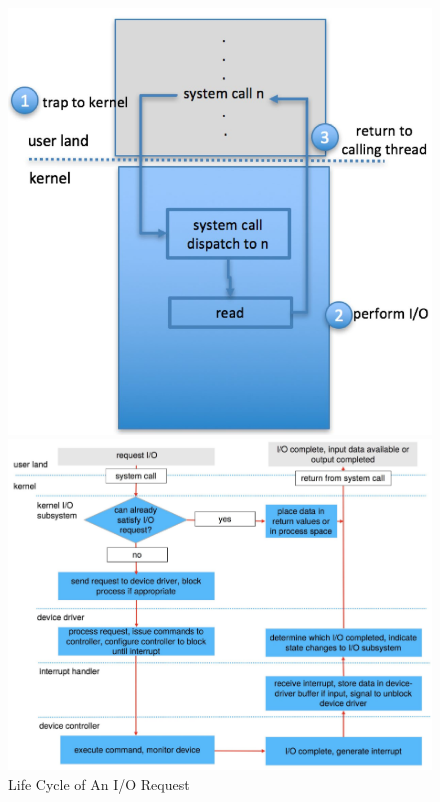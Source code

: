 \begin{figure}[h!]
    \begin{minipage}[h!]{.5\textwidth}
        \centering
        \includegraphics[width=1\linewidth]{img/gfnfgnfgn.png}
    \end{minipage}
    \begin{minipage}[h!]{.5\textwidth}
        \centering
        \includegraphics[width=1\linewidth]{img/fnbdgfnbdg.png}
        \caption{Life Cycle of An I/O Request}
    \end{minipage}
\end{figure}

